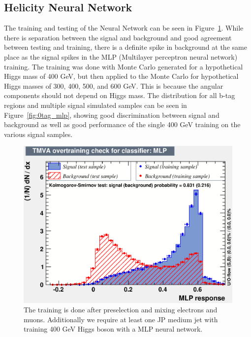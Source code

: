 \subsection{Helicity Neural Network}
The training and testing of the Neural Network can be seen in Figure~\ref{fig:NNOutput}.  While there is separation between the signal and background and good agreement between testing and training, there is a definite spike in background at the same place as the signal spikes in the MLP (Multilayer perceptron neural network) training. The training was done with Monte Carlo generated for a hypothetical Higgs mass of 400 GeV, but then applied to the Monte Carlo for hypothetical Higgs masses of 300, 400, 500, and 600 GeV. This is because the angular components should not depend on Higgs mass. The distribution for all b-tag regions and multiple signal simulated samples can be seen in Figure~\ref{fig:0tag_mlp}, showing good discrimination between signal and background as well as good performance of the single 400 GeV training on the various signal samples.

\begin{figure}[htb!]
\begin{center}
\centerline{
\includegraphics[width=0.8\linewidth]{Optimization/MLP.eps}
}
\caption{
The training is done after preselection and mixing electrons and muons.  Additionally we require at least one JP medium jet with training 400 GeV Higgs boson with a MLP neural network.
}
\label{fig:NNOutput}
\end{center}
\end{figure}


